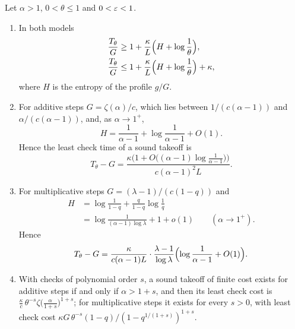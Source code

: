 \begin{proposition}\label{prop:osgood}
Let $\alpha>1$, $0<\theta\le1$ and $0<\varepsilon<1$.
\begin{enumerate}[label=\textup{(\roman*)},leftmargin=2.2em,itemsep=1pt]
\item In both models
\[
\begin{aligned}
\frac{T_{\theta}}{G}&\ge 1+\frac{\kappa}{L}\Bigl(H+\log\frac1\theta\Bigr),\\
\frac{T_{\theta}}{G}&\le 1+\frac{\kappa}{L}\Bigl(H+\log\frac1\theta\Bigr)+\kappa ,
\end{aligned}
\]
where $H$ is the entropy of the profile $g/G$.
\item For additive steps $G=\zeta(\alpha)/c$, which lies between $1/(c(\alpha-1))$ and $\alpha/(c(\alpha-1))$, and, as $\alpha\to1^{+}$,
\[
H=\frac1{\alpha-1}+\log\frac1{\alpha-1}+O(1).
\]
Hence the least check time of a sound takeoff is
\[
T_{\theta}-G=\frac{\kappa\bigl(1+O\bigl((\alpha-1)\log\frac1{\alpha-1}\bigr)\bigr)}{c(\alpha-1)^{2}L}.
\]
\item For multiplicative steps $G=(\lambda-1)/(c(1-q))$ and
\[
\begin{aligned}
H&=\log\frac1{1-q}+\frac{q}{1-q}\log\frac1q\\
&=\log\frac1{(\alpha-1)\log\lambda}+1+o(1)\qquad(\alpha\to1^{+}).
\end{aligned}
\]
Hence
\[
T_{\theta}-G=\frac{\kappa}{c(\alpha-1)L}\cdot\frac{\lambda-1}{\log\lambda}\Bigl(\log\frac1{\alpha-1}+O(1)\Bigr).
\]
\item With checks of polynomial order $s$, a sound takeoff of finite cost exists for additive steps if and only if $\alpha>1+s$, and then its least check cost is $\frac{\kappa}{c}\,\theta^{-s}\zeta\bigl(\frac{\alpha}{1+s}\bigr)^{1+s}$; for multiplicative steps it exists for every $s>0$, with least check cost $\kappa G\,\theta^{-s}(1-q)/(1-q^{1/(1+s)})^{1+s}$.
\end{enumerate}
\end{proposition}

